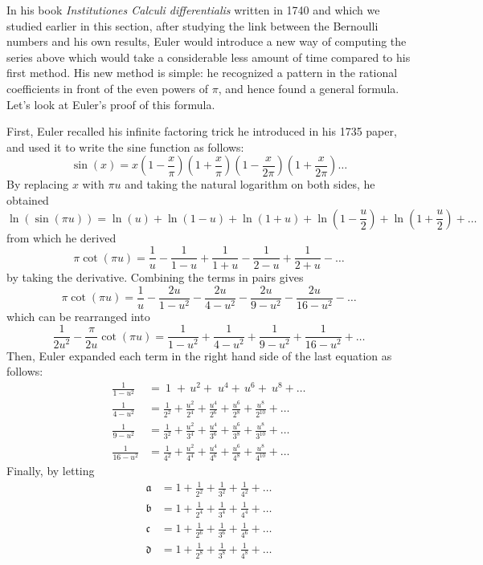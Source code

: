 In his book \textit{Institutiones Calculi differentialis} written in 1740 and which we studied earlier in this section, after studying the link between the Bernoulli numbers and his own results, Euler would introduce a new way of computing the series above which would take a considerable less amount of time compared to his first method. His new method is simple: he recognized a pattern in the rational coefficients in front of the even powers of $\pi$, and hence found a general formula. Let's look at Euler's proof of this formula.

First, Euler recalled his infinite factoring trick he introduced in his 1735 paper, and used it to write the sine function as follows:
$$\sin(x) = x\left(1 - \frac{x}{\pi}\right)\left(1 + \frac{x}{\pi}\right)\left(1 - \frac{x}{2\pi}\right)\left(1 + \frac{x}{2\pi}\right) \dots $$
By replacing $x$ with $\pi u$ and taking the natural logarithm on both sides, he obtained
$$\ln(\sin(\pi u)) = \ln(u) + \ln\left(1 - u\right) + \ln\left(1 + u\right) + \ln\left(1 - \frac{u}{2}\right) + \ln\left(1 + \frac{u}{2}\right) + \dots $$
from which he derived
$$\pi \cot(\pi u) = \frac{1}{u} - \frac{1}{1 - u} + \frac{1}{1 + u} - \frac{1}{2 - u} + \frac{1}{2 + u} - \dots $$
by taking the derivative. Combining the terms in pairs gives
$$\pi \cot(\pi u) = \frac{1}{u} - \frac{2u}{1 - u^2} - \frac{2u}{4 - u^2} - \frac{2u}{9 - u^2}- \frac{2u}{16 - u^2} - \dots $$
which can be rearranged into
$$\frac{1}{2u^2} - \frac{\pi}{2u}\cot(\pi u) = \frac{1}{1 - u^2} + \frac{1}{4 - u^2} + \frac{1}{9 - u^2} + \frac{1}{16 - u^2} + \dots $$
Then, Euler expanded each term in the right hand side of the last equation as follows:
\begin{align*}
    \frac{1}{1 - u^2} &= \ 1 \; + \, u^2 + \; u^4 + \, u^6 + \ u^8 + \dots \\
    \frac{1}{4 - u^2} &= \frac{1}{2^2} + \frac{u^2}{2^4} + \frac{u^4}{2^6} + \frac{u^6}{2^8} + \frac{u^8}{2^{10}} + \dots \\
    \frac{1}{9 - u^2} &= \frac{1}{3^2} + \frac{u^2}{3^4} + \frac{u^4}{3^6} + \frac{u^6}{3^8} + \frac{u^8}{3^{10}} + \dots \\
    \frac{1}{16 - u^2} &= \frac{1}{4^2} + \frac{u^2}{4^4} + \frac{u^4}{4^6} + \frac{u^6}{4^8} + \frac{u^8}{4^{10}} + \dots 
\end{align*}
Finally, by letting
\begin{align*}
    \mathfrak{a} &= 1 + \frac{1}{2^2} + \frac{1}{3^2} + \frac{1}{4^2} + \dots \\
    \mathfrak{b} &= 1 + \frac{1}{2^4} + \frac{1}{3^4} + \frac{1}{4^4} + \dots \\
    \mathfrak{c} &= 1 + \frac{1}{2^6} + \frac{1}{3^6} + \frac{1}{4^6} + \dots \\
    \mathfrak{d} &= 1 + \frac{1}{2^8} + \frac{1}{3^8} + \frac{1}{4^8} + \dots 
\end{align*}
